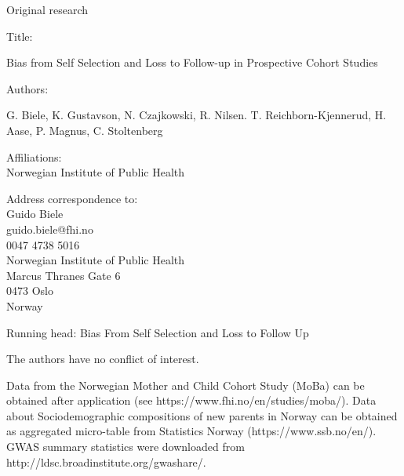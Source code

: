 \documentclass[letter]{article}
\begin{document}
	
	
	\begin{center}
		{\large Original research}
		\vfill
		{\large
			Title:
			
			Bias from Self Selection and Loss to Follow-up in Prospective Cohort Studies}
		\vfill
		
		Authors:
		
		G. Biele, K. Gustavson, N. Czajkowski, R. Nilsen. T. Reichborn-Kjennerud, H. Aase, P. Magnus, C. Stoltenberg
		
		\vfill
		Affiliations:\\
		Norwegian Institute of Public Health 
		
	\end{center}
\vfill		
		Address correspondence to: \\
		Guido Biele \\
		guido.biele@fhi.no \\
		0047 4738 5016 \\
		Norwegian Institute of Public Health \\
		Marcus Thranes Gate 6 \\
		0473 Oslo \\
		Norway 
		\vfill
		
		Running head: Bias From Self Selection and Loss to Follow Up
		\vfill
		
		The authors have no conflict of interest.
		\vfill
		
		Data from the Norwegian Mother and Child Cohort Study (MoBa) can be obtained after application (see https://www.fhi.no/en/studies/moba/). Data about Sociodemographic compositions of new parents in Norway can be obtained as aggregated micro-table from Statistics Norway (https://www.ssb.no/en/). GWAS summary statistics were downloaded from http://ldsc.broadinstitute.org/gwashare/.
	
	
	
	
	
	
	

	
	
	
	
	
\end{document}
